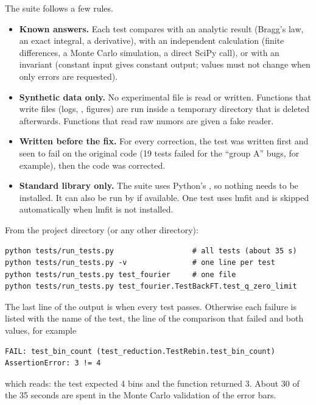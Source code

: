 \documentclass[11pt,a4paper]{article}
\begin{document}
The suite follows a few rules.
\begin{itemize}
  \item \textbf{Known answers.} Each test compares with an analytic result
    (Bragg's law, an exact integral, a derivative), with an independent
    calculation (finite differences, a Monte Carlo simulation, a direct
    SciPy call), or with an invariant (constant input gives constant
    output; values must not change when only errors are requested).
  \item \textbf{Synthetic data only.} No experimental file is read or
    written. Functions that write files (logs, , figures) are
    run inside a temporary directory that is deleted afterwards. Functions
    that read raw numors are given a fake reader.
  \item \textbf{Written before the fix.} For every correction, the test was
    written first and seen to fail on the original code (19 tests failed
    for the ``group A'' bugs, for example), then the code was corrected.
  \item \textbf{Standard library only.} The suite uses Python's
    , so nothing needs to be installed. It can also be run
    by  if available. One test uses lmfit and is skipped
    automatically when lmfit is not installed.
\end{itemize}


From the project directory (or any other directory):
\begin{lstlisting}
python tests/run_tests.py                  # all tests (about 35 s)
python tests/run_tests.py -v               # one line per test
python tests/run_tests.py test_fourier     # one file
python tests/run_tests.py test_fourier.TestBackFT.test_q_zero_limit
\end{lstlisting}
The last line of the output is  when every test passes. Otherwise
each failure is listed with the name of the test, the line of the
comparison that failed and both values, for example
\begin{lstlisting}
FAIL: test_bin_count (test_reduction.TestRebin.test_bin_count)
AssertionError: 3 != 4
\end{lstlisting}
which reads: the test expected 4 bins and the function returned 3. About
30 of the 35 seconds are spent in the Monte Carlo validation of the error
bars.

\end{document}
